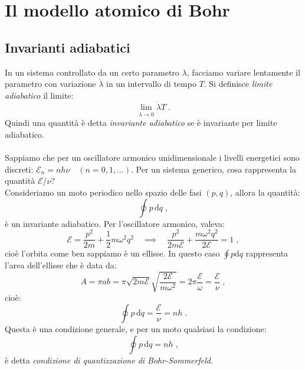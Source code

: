 \documentclass[10pt,a4paper]{report}
\theoremstyle{definition}
\numberwithin{equation}{section}
\newcommand{\diff}[1][]{\mathrm{d}#1}
\begin{document}
\section{Il modello atomico di Bohr}
\subsection{Invarianti adiabatici}
In un sistema controllato da un certo parametro $\lambda$, facciamo variare lentamente il parametro con variazione $\dot{\lambda}$ in un intervallo di tempo $T$. Si definisce \textit{limite adiabatico} il limite:
\begin{equation}
\lim_{\dot{\lambda}\to 0} \dot{\lambda}T\;.
\end{equation}
Quindi una quantità è detta \textit{invariante adiabatico} se è invariante per limite adiabatico. \\
\\
Sappiamo che per un oscillatore armonico unidimensionale i livelli energetici sono discreti: $\mathcal{E}_n=nh\nu \quad (n=0,1,\ldots)$. Per un sistema generico, cosa rappresenta la quantità $\mathcal{E}/\nu$? \\
Consideriamo un moto periodico nello spazio delle fasi $(p,q)$, allora la quantità:
$$
\oint p\,\diff{q}\;,
$$
è un invariante adiabatico. Per l'oscillatore armonico, valeva:
$$
\mathcal{E}=\frac{p^2}{2m}+\frac{1}{2}m\omega^2q^2\quad \implies\quad \frac{p^2}{2m\mathcal{E}}+\frac{m\omega^2q^2}{2\mathcal{E}}=1\;,
$$
cioè l'orbita come ben sappiamo è un ellisse. In questo caso $\oint p\diff{q}$ rappresenta l'area dell'ellisse che è data da:
$$
A=\pi a b= \pi \sqrt{2m\mathcal{E}}\sqrt{\frac{2\mathcal{E}}{m\omega^2}}=2\pi\frac{\mathcal{E}}{\omega}=\frac{\mathcal{E}}{\nu}\;,
$$
cioè:
\begin{equation*}
\oint p\,\diff{q}=\frac{\mathcal{E}}{\nu}=nh\;.
\end{equation*}
Questa è una condizione generale, e per un moto qualsiasi la condizione:
\begin{equation}
\oint p\,\diff{q}=nh\;,
\end{equation}
è detta \textit{condizione di quantizzazione di Bohr-Sommerfeld}.
\end{document}
